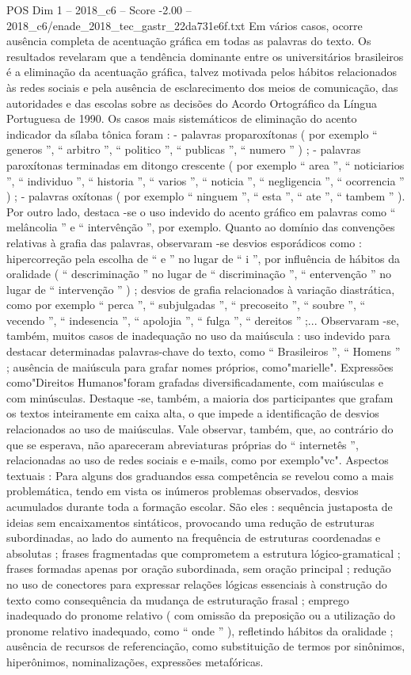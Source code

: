 \begin{textsample}{POS Dim 1 – 2018\_c6 – Score -2.00 – 2018\_c6/enade\_2018\_tec\_gastr\_22da731e6f.txt}
Em vários casos, ocorre ausência completa de acentuação gráfica em todas as palavras do texto.
Os resultados revelaram que a tendência dominante entre os universitários brasileiros é a eliminação da acentuação gráfica, talvez motivada pelos hábitos relacionados às redes sociais e pela ausência de esclarecimento dos meios de comunicação, das autoridades e das escolas sobre as decisões do Acordo Ortográfico da Língua Portuguesa de 1990.
Os casos mais sistemáticos de eliminação do acento indicador da sílaba tônica foram : - palavras proparoxítonas ( por exemplo “ generos ”, “ arbitro ”, “ politico ”, “ publicas ”, “ numero ” ) ; - palavras paroxítonas terminadas em ditongo crescente ( por exemplo “ area ”, “ noticiarios ”, “ individuo ”, “ historia ”, “ varios ”, “ noticia ”, “ negligencia ”, “ ocorrencia ” ) ; - palavras oxítonas ( por exemplo “ ninguem ”, “ esta ”, “ ate ”, “ tambem ” ).
Por outro lado, destaca -se o uso indevido do acento gráfico em palavras como “ melâncolia ” e “ intervênção ”, por exemplo.
Quanto ao domínio das convenções relativas à grafia das palavras, observaram -se desvios esporádicos como : hipercorreção pela escolha de “ e ” no lugar de “ i ”, por influência de hábitos da oralidade ( “ descriminação ” no lugar de “ discriminação ”, “ entervenção ” no lugar de “ intervenção ” ) ; desvios de grafia relacionados à variação diastrática, como por exemplo “ perca ”, “ subjulgadas ”, “ precoseito ”, “ soubre ”, “ vecendo ”, “ indesencia ”, “ apolojia ”, “ fulga ”, “ dereitos ” ;...
Observaram -se, também, muitos casos de inadequação no uso da maiúscula : uso indevido para destacar determinadas palavras-chave do texto, como “ Brasileiros ”, “ Homens ” ; ausência de maiúscula para grafar nomes próprios, como"marielle".
Expressões como"Direitos Humanos"foram grafadas diversificadamente, com maiúsculas e com minúsculas.
Destaque -se, também, a maioria dos participantes que grafam os textos inteiramente em caixa alta, o que impede a identificação de desvios relacionados ao uso de maiúsculas.
Vale observar, também, que, ao contrário do que se esperava, não apareceram abreviaturas próprias do “ internetês ”, relacionadas ao uso de redes sociais e e-mails, como por exemplo"vc".
Aspectos textuais : Para alguns dos graduandos essa competência se revelou como a mais problemática, tendo em vista os inúmeros problemas observados, desvios acumulados durante toda a formação escolar.
São eles : sequência justaposta de ideias sem encaixamentos sintáticos, provocando uma redução de estruturas subordinadas, ao lado do aumento na frequência de estruturas coordenadas e absolutas ; frases fragmentadas que comprometem a estrutura lógico-gramatical ; frases formadas apenas por oração subordinada, sem oração principal ; redução no uso de conectores para expressar relações lógicas essenciais à construção do texto como consequência da mudança de estruturação frasal ; emprego inadequado do pronome relativo ( com omissão da preposição ou a utilização do pronome relativo inadequado, como “ onde ” ), refletindo hábitos da oralidade ; ausência de recursos de referenciação, como substituição de termos por sinônimos, hiperônimos, nominalizações, expressões metafóricas.

\end{textsample}
